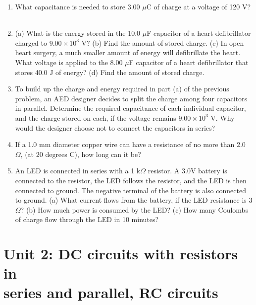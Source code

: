 \documentclass[12pt,twocolumn]{article}
\begin{document}
\noindent
\begin{enumerate}
\item What capacitance is needed to store 3.00 $\mu$C of charge at a voltage of 120 V? \\ \\
\item (a) What is the energy stored in the 10.0 $\mu$F capacitor of a heart defibrillator charged to $9.00\times 10^3$ V? (b) Find the amount of stored charge. (c) In open heart surgery, a much smaller amount of energy will defibrillate the heart.  What voltage is applied to the 8.00 $\mu$F capacitor of a heart defibrillator that stores 40.0 J of energy? (d) Find the amount of stored charge. \\ \vspace{4cm}
\item To build up the charge and energy required in part (a) of the previous problem, an AED designer decides to split the charge among four capacitors in parallel.  Determine the required capacitance of each individual capacitor, and the charge stored on each, if the voltage remains $9.00 \times 10^3$ V.  Why would the designer choose not to connect the capacitors in series? \\ \vspace{5cm}
\item If a 1.0 mm diameter copper wire can have a resistance of no more than 2.0 $\Omega$, (at 20 degrees C), how long can it be? \\ \vspace{3cm}
\item An LED is connected in series with a 1 k$\Omega$ resistor.  A 3.0V battery is connected to the resistor, the LED follows the resistor, and the LED is then connected to ground.  The negative terminal of the battery is also connected to ground.  (a) What current flows from the battery, if the LED resistance is $3$ $\Omega$? (b) How much power is consumed by the LED? (c) How many Coulombs of charge flow through the LED in 10 minutes? \\ \vspace{3cm}
\end{enumerate}

\section{Unit 2: DC circuits with resistors in \\ series and parallel, RC circuits}
\end{document}
